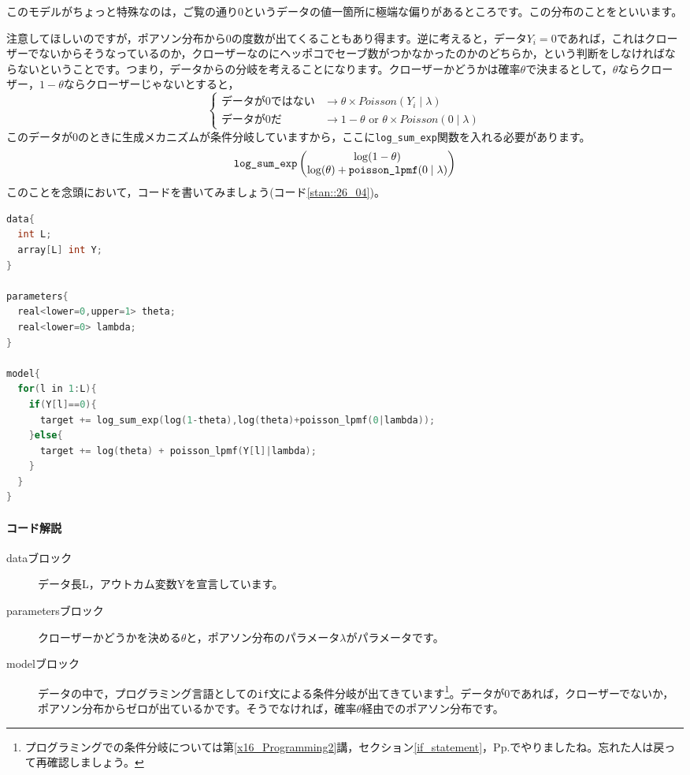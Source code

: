 \documentclass{ltjsbook}
\begin{document}
このモデルがちょっと特殊なのは，ご覧の通り0というデータの値一箇所に極端な偏りがあるところです。この分布のことをといいます。

注意してほしいのですが，ポアソン分布から0の度数が出てくることもあり得ます。逆に考えると，データ$Y_i=0$であれば，これはクローザーでないからそうなっているのか，クローザーなのにヘッポコでセーブ数がつかなかったのかのどちらか，という判断をしなければならないということです。つまり，データからの分岐を考えることになります。クローザーかどうかは確率$\theta$で決まるとして，$\theta$ならクローザー，$1-\theta$ならクローザーじゃないとすると，
\begin{equation}
	\left\{ \begin{array}{cc} \mbox{データが0ではない} & \to \theta \times Poisson(Y_i\mid\lambda)                    \\
             \mbox{データが0だ}         & \to 1-\theta \mbox{ or } \theta \times Poisson(0\mid\lambda)\end{array} \right.
\end{equation}
このデータが0のときに生成メカニズムが条件分岐していますから，ここに\verb|log_sum_exp|関数を入れる必要があります。
\begin{equation*}
	\verb|log_sum_exp| \begin{pmatrix} \log(1-\theta) \\ \log(\theta) + \verb|poisson_lpmf|(0\mid\lambda)\end{pmatrix}
\end{equation*}
このことを念頭において，コードを書いてみましょう(コード\ref{stan::26_04})。
\begin{lstlisting}[language=C++,label={stan::26_04},caption={ゼロ過剰ポアソン分布}]
data{
  int L;
  array[L] int Y;
}

parameters{
  real<lower=0,upper=1> theta;
  real<lower=0> lambda;
}

model{
  for(l in 1:L){
    if(Y[l]==0){
      target += log_sum_exp(log(1-theta),log(theta)+poisson_lpmf(0|lambda));
    }else{
      target += log(theta) + poisson_lpmf(Y[l]|lambda);
    }
  }
}
\end{lstlisting}
\paragraph{コード解説}
\begin{description}
	\item[dataブロック] データ長L，アウトカム変数Yを宣言しています。
	\item[parametersブロック] クローザーかどうかを決める$\theta$と，ポアソン分布のパラメータ$\lambda$がパラメータです。
	\item[modelブロック] データの中で，プログラミング言語としての\verb|if|文による条件分岐が出てきています\footnote{プログラミングでの条件分岐については第\ref{x16_Programming2}講，セクション\ref{if_statement}，Pp.\pageref{if_statement}でやりましたね。忘れた人は戻って再確認しましょう。}。データが0であれば，クローザーでないか，ポアソン分布からゼロが出ているかです。そうでなければ，確率$\theta$経由でのポアソン分布です。
\end{description}
\end{document}

